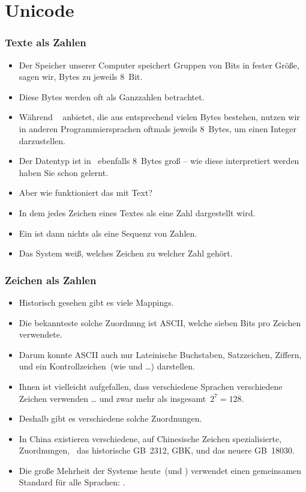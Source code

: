 \documentclass[aspectratio=169,mathserif,notheorems]{beamer}%
\begin{document}
\section{Unicode}%
%
\begin{frame}%
\frametitle{Texte als Zahlen}%
\begin{itemize}%
\item Der Speicher unserer Computer speichert Gruppen von Bits in fester Größe, sagen wir, Bytes zu jeweils 8~Bit.%
\item<2-> Diese Bytes werden oft als Ganzzahlen betrachtet.%
\item<3-> Während \python\   anbietet, die aus entsprechend vielen Bytes bestehen, nutzen wir in anderen Programmiersprachen oftmals jeweils 8~Bytes, um einen Integer darzustellen.
\item<4-> Der Datentyp  ist in \python\ ebenfalls 8~Bytes groß -- wie diese interpretiert werden haben Sie schon gelernt.%
\item<5-> Aber wie funktioniert das mit Text?%
\item<6-> In dem jedes Zeichen eines Textes als eine Zahl dargestellt wird.%
\item<7-> Ein  ist dann nichts als eine Sequenz von Zahlen.%
\item<8-> Das System weiß, welches Zeichen zu welcher Zahl gehört.
\end{itemize}%
\end{frame}%
%
\begin{frame}%
\frametitle{Zeichen als Zahlen}%
\begin{itemize}%
\item Historisch gesehen gibt es viele  Mappings.%
\item<2-> Die bekannteste solche Zuordnung ist ASCII, welche sieben Bits pro Zeichen verwendete.%
\item<3-> Darum konnte ASCII auch nur Lateinische Buchstaben, Satzzeichen, Ziffern, und ein Kontrollzeichen~(wie \textil{\\t} und \textil{\\n}\dots) darstellen.%
\item<4-> Ihnen ist vielleicht aufgefallen, dass verschiedene Sprachen verschiedene Zeichen verwenden {\dots} und zwar mehr als insgesamt~$2^7=128$.%
\item<5-> Deshalb gibt es verschiedene solche Zuordnungen.%
\item<6-> In China existieren verschiedene, auf Chinesische Zeichen spezialisierte, Zuordnungen, \DEzB\ das historische GB~2312, GBK, und das neuere GB~18030.%
\item<7-> Die große Mehrheit der Systeme heute~(und \python) verwendet einen gemeinsamen Standard für \alert{alle} Sprachen: .%
\end{itemize}%
\end{frame}%
\end{document}
